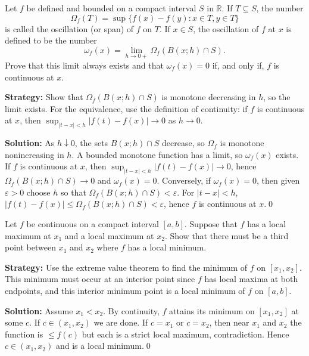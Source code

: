 \begin{problembox}
Let \( f \) be defined and bounded on a compact interval \( S \) in \( \mathbb{R} \). If \( T \subseteq S \), the number
\[\Omega_f(T) = \sup \{f(x) - f(y) : x \in T, y \in T\}\]
is called the oscillation (or span) of \( f \) on \( T \). If \( x \in S \), the oscillation of \( f \) at \( x \) is defined to be the number
\[\omega_f(x) = \lim_{h \to 0+} \Omega_f(B(x; h) \cap S).\]
Prove that this limit always exists and that \( \omega_f(x) = 0 \) if, and only if, \( f \) is continuous at \( x \).
\end{problembox}

\noindent\textbf{Strategy:} Show that $\Omega_f(B(x;h) \cap S)$ is monotone decreasing in $h$, so the limit exists. For the equivalence, use the definition of continuity: if $f$ is continuous at $x$, then $\sup_{|t-x|<h} |f(t) - f(x)| \to 0$ as $h \to 0$.

\bigskip\noindent\textbf{Solution:}
As $h\downarrow 0$, the sets $B(x;h)\cap S$ decrease, so $\Omega_f$ is monotone nonincreasing in $h$. A bounded monotone function has a limit, so $\omega_f(x)$ exists. If $f$ is continuous at $x$, then $\sup_{|t-x|<h}|f(t)-f(x)|\to 0$, hence $\Omega_f(B(x;h)\cap S)\to 0$ and $\omega_f(x)=0$. Conversely, if $\omega_f(x)=0$, then given $\varepsilon>0$ choose $h$ so that $\Omega_f(B(x;h)\cap S)<\varepsilon$. For $|t-x|<h$, $|f(t)-f(x)|\le \Omega_f(B(x;h)\cap S)<\varepsilon$, hence $f$ is continuous at $x$.\qed



\begin{problembox}
Let \( f \) be continuous on a compact interval \([a, b]\). Suppose that \( f \) has a local maximum at \( x_1 \) and a local maximum at \( x_2 \). Show that there must be a third point between \( x_1 \) and \( x_2 \) where \( f \) has a local minimum.
\end{problembox}

\noindent\textbf{Strategy:} Use the extreme value theorem to find the minimum of $f$ on $[x_1, x_2]$. This minimum must occur at an interior point since $f$ has local maxima at both endpoints, and this interior minimum point is a local minimum of $f$ on $[a,b]$.

\bigskip\noindent\textbf{Solution:}
Assume $x_1<x_2$. By continuity, $f$ attains its minimum on $[x_1,x_2]$ at some $c$. If $c\in(x_1,x_2)$ we are done. If $c=x_1$ or $c=x_2$, then near $x_1$ and $x_2$ the function is $\le f(c)$ but each is a strict local maximum, contradiction. Hence $c\in(x_1,x_2)$ and is a local minimum.\qed



